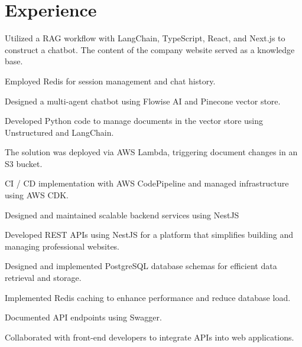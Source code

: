 \documentclass[letterpaper]{deedy-resume} %
\begin{document}
\begin{minipage}[t]{0.66\textwidth} %


\section{Experience}


\vspace{\topsep} %
\begin{tightitemize}
\item Utilized a RAG workflow with LangChain, TypeScript, React, and Next.js to construct a chatbot. The content of the company website served as a knowledge base.
\item Employed Redis for session management and chat history.
\item Designed a multi-agent chatbot using Flowise AI and Pinecone vector store.
\item Developed Python code to manage documents in the vector store using Unstructured and LangChain.
\item The solution was deployed via AWS Lambda, triggering document changes in an S3 bucket.
\item CI / CD implementation with AWS CodePipeline and managed infrastructure using AWS CDK.
\item Designed and maintained scalable backend services using NestJS
\end{tightitemize}

\sectionspace %



\vspace{\topsep} %
\begin{tightitemize}
\item Developed REST APIs using NestJS for a platform that simplifies building and managing professional websites.
\item Designed and implemented PostgreSQL database schemas for efficient data retrieval and storage.
\item Implemented Redis caching to enhance performance and reduce database load.
\item Documented API endpoints using Swagger.
\item Collaborated with front-end developers to integrate APIs into web applications.
\end{tightitemize}


\end{minipage}
\end{document}
